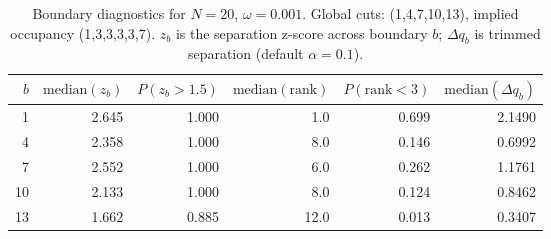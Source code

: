 \begin{table}[t]
\centering
\small
\setlength{\tabcolsep}{4pt}
\renewcommand{\arraystretch}{1.15}
\begin{tabular}{rrrrrr}
\toprule
$b$ & $\mathrm{median}(z_b)$ & $P(z_b>1.5)$ & $\mathrm{median}(\mathrm{rank})$ & $P(\mathrm{rank}<3)$ & $\mathrm{median}(\Delta q_b)$ \\
\midrule
1 & 2.645 & 1.000 & 1.0 & 0.699 & 2.1490 \\
4 & 2.358 & 1.000 & 8.0 & 0.146 & 0.6992 \\
7 & 2.552 & 1.000 & 6.0 & 0.262 & 1.1761 \\
10 & 2.133 & 1.000 & 8.0 & 0.124 & 0.8462 \\
13 & 1.662 & 0.885 & 12.0 & 0.013 & 0.3407 \\
\bottomrule
\end{tabular}
\caption{Boundary diagnostics for $N=20$, $\omega=0.001$. Global cuts: (1,4,7,10,13), implied occupancy (1,3,3,3,3,7). $z_b$ is the separation z-score across boundary $b$; $\Delta q_b$ is trimmed separation (default $\alpha=0.1$).}
\label{tab:boundaries_N20_omega0p001}
\end{table}